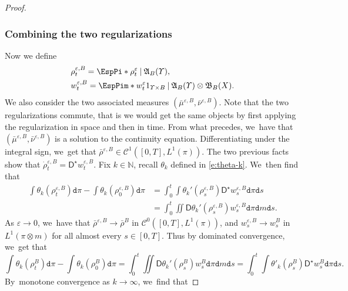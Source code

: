 \documentclass[10pt]{amsart}
\theoremstyle{definition}
\theoremstyle{remark}
\newcommand{\given}[1][]{%
\nonscript\:#1\vert
\allowbreak
\nonscript\:
\mathopen{}}
\begin{document}
\begin{proof}
\subsubsection*{Combining the two regularizations}
Now we define
\begin{align*}
& \rho^{\varepsilon,B}_{t} = \EspPi*{ \rho^{\varepsilon}_{t} \given \mathfrak{A}_{B}(\varUpsilon) }, \\
& w^{\varepsilon,B}_{t} = \EspPim*{ w^{\varepsilon}_{t} 1_{\varUpsilon \times B} \given \mathfrak{A}_{B}(\varUpsilon) \otimes \mathfrak{B}_{B}(X) }.
\end{align*}
We also consider the two associated measures $(\bar{\mu}^{\varepsilon, B}, \bar{\nu}^{\varepsilon,B})$.
Note that the two regularizations commute, that is we would get the same objects by first applying the regularization in space and then in time.
From what precedes, we~have that $(\bar{\mu}^{\varepsilon, B}, \bar{\nu}^{\varepsilon,B})$ is a solution to the continuity equation.
Differentiating under the integral sign, we~get that $\bar{\rho}^{\varepsilon, B} \in \mathscr{C}^{1}([0,T], L^{1}(\pi))$.
The two previous facts show that $\dot{\rho}^{\varepsilon,B}_{t} = \mathsf{D}^{\star} w_{t}^{\varepsilon,B}$.
Fix $k \in \mathbb{N}$, recall $\theta_{k}$ defined in \cref{e:theta-k}. We~then find that
\begin{align*}
\int \theta_{k}(\rho^{\varepsilon,B}_{t}) \mathtt{d} \pi - \int \theta_{k}(\rho^{\varepsilon,B}_{0}) \mathtt{d} \pi &= \int_{0}^{t} \int \theta_{k}'(\rho_{s}^{\varepsilon,B}) \mathsf{D}^{\star} w_{s}^{\varepsilon, B} \mathtt{d} \pi \mathtt{d} s \\
&= \int_{0}^{t} \iint \mathsf{D} \theta_{k}'(\rho_{s}^{\varepsilon,B}) w_{s}^{\varepsilon, B} \mathtt{d} \pi \mathtt{d} m \mathtt{d} s.
\end{align*}
As $\varepsilon \to 0$, we~have that $\bar{\rho}^{\varepsilon,B} \to \bar{\rho}^{B}$ in $\mathscr{C}^{0}([0,T], L^{1}(\pi))$, and $w_{s}^{\varepsilon,B} \to w_{s}^{B}$ in $L^{1}(\pi \otimes m)$ for all almost every $s \in [0,T]$.
Thus by dominated convergence, we~get that
\begin{equation*}
\int \theta_{k}(\rho^{B}_{t}) \mathtt{d} \pi - \int \theta_{k}(\rho^{B}_{0}) \mathtt{d} \pi = \int_{0}^{t} \iint \mathsf{D} \theta_{k}'(\rho_{s}^{B}) w_{s}^{B} \mathtt{d} \pi \mathtt{d} m \mathtt{d} s = \int_{0}^{t} \int \theta'_{k}(\rho^{B}_{s}) \mathsf{D}^{\star} w^{B}_{s} \mathtt{d} \pi \mathtt{d} s.
\end{equation*}
By~monotone convergence as $k \to \infty$, we~find that

\end{proof}
\end{document}
